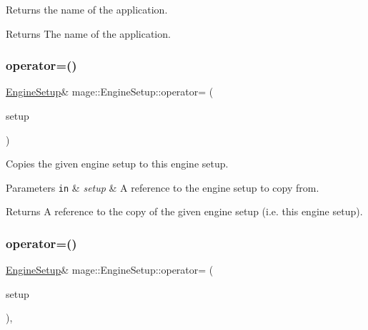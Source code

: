 Returns the name of the application.

\begin{DoxyReturn}{Returns}
The name of the application. 
\end{DoxyReturn}
\mbox{\label{classmage_1_1_engine_setup_a4234ca6df84db6a2005b994ed42da11f}} 
\subsubsection{\texorpdfstring{operator=()}{operator=()}\hspace{0.1cm}{\footnotesize\ttfamily [1/2]}}
{\footnotesize\ttfamily \mbox{\hyperlink{classmage_1_1_engine_setup}{Engine\+Setup}}\& mage\+::\+Engine\+Setup\+::operator= (\begin{DoxyParamCaption}\item[{const \mbox{\hyperlink{classmage_1_1_engine_setup}{Engine\+Setup}} \&}]{setup }\end{DoxyParamCaption})\hspace{0.3cm}{\ttfamily [default]}}

Copies the given engine setup to this engine setup.


\begin{DoxyParams}[1]{Parameters}
\mbox{\tt in}  & {\em setup} & A reference to the engine setup to copy from. \\
\hline
\end{DoxyParams}
\begin{DoxyReturn}{Returns}
A reference to the copy of the given engine setup (i.\+e. this engine setup). 
\end{DoxyReturn}
\mbox{\label{classmage_1_1_engine_setup_a4c2e71f96f138b28fd6ff1c088d05a53}} 
\subsubsection{\texorpdfstring{operator=()}{operator=()}\hspace{0.1cm}{\footnotesize\ttfamily [2/2]}}
{\footnotesize\ttfamily \mbox{\hyperlink{classmage_1_1_engine_setup}{Engine\+Setup}}\& mage\+::\+Engine\+Setup\+::operator= (\begin{DoxyParamCaption}\item[{\mbox{\hyperlink{classmage_1_1_engine_setup}{Engine\+Setup}} \&\&}]{setup }\end{DoxyParamCaption})\hspace{0.3cm}{\ttfamily [default]}, {\ttfamily [noexcept]}}

